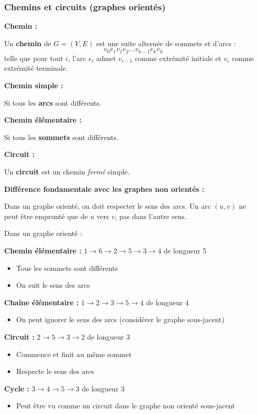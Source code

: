 \documentclass[12pt,a4paper]{article}
\begin{document}
\subsubsection{Chemins et circuits (graphes orientés)}

\begin{definition}
\textbf{Chemin :}

Un \textcolor{titrebleu}{\textbf{chemin}} de $G = (V, E)$ est une suite alternée de sommets et d'arcs :
$$v_0 e_1 v_1 e_2 \ldots v_{k-1} e_k v_k$$
telle que pour tout $i$, l'arc $e_i$ admet $v_{i-1}$ comme extrémité initiale et $v_i$ comme extrémité terminale.

\textbf{Chemin simple :}

Si tous les \textcolor{defvert}{\textbf{arcs}} sont différents.

\textbf{Chemin élémentaire :}

Si tous les \textcolor{algoviolet}{\textbf{sommets}} sont différents.

\textbf{Circuit :}

Un \textcolor{exempleorange}{\textbf{circuit}} est un chemin \textit{fermé} simple.
\end{definition}

\begin{notecours}
\textbf{Différence fondamentale avec les graphes non orientés :}

Dans un graphe orienté, on doit respecter le sens des arcs. Un arc $(u, v)$ ne peut être emprunté que de $u$ vers $v$, pas dans l'autre sens.
\end{notecours}

\begin{exemple}
Dans un graphe orienté :

\textbf{Chemin élémentaire :} $1 \to 6 \to 2 \to 5 \to 3 \to 4$ de longueur 5
\begin{itemize}
    \item Tous les sommets sont différents
    \item On suit le sens des arcs
\end{itemize}

\textbf{Chaîne élémentaire :} $1 \to 2 \to 3 \to 5 \to 4$ de longueur 4
\begin{itemize}
    \item On peut ignorer le sens des arcs (considérer le graphe sous-jacent)
\end{itemize}

\textbf{Circuit :} $2 \to 5 \to 3 \to 2$ de longueur 3
\begin{itemize}
    \item Commence et finit au même sommet
    \item Respecte le sens des arcs
\end{itemize}

\textbf{Cycle :} $3 \to 4 \to 5 \to 3$ de longueur 3
\begin{itemize}
    \item Peut être vu comme un circuit dans le graphe non orienté sous-jacent
\end{itemize}
\end{exemple}
\end{document}
